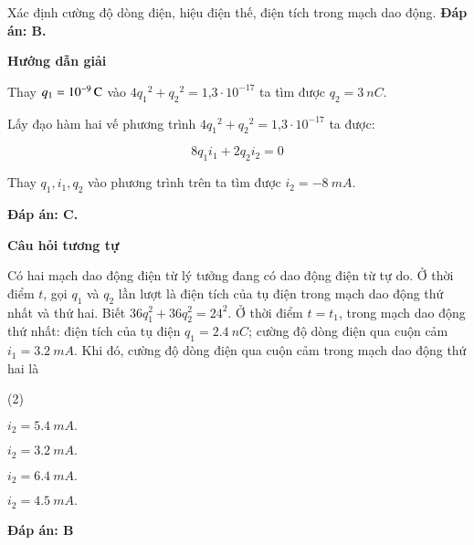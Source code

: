 \begin{dang}{Xác định cường độ dòng điện, hiệu điện thế, điện tích trong mạch dao động.}
{		\textbf{Đáp án: B.} 
	}
	{	\begin{center}
			\textbf{Hướng dẫn giải}
		\end{center}
		
		Thay $q_1 = \xsi{10^{-9}}{C}$ vào $4{q_1}^{2}+{q_2}^{2} = \text{1,3}\cdot10^{-17}$ ta tìm được $q_2 = \SI{3}{nC}$. 
		
		Lấy đạo hàm hai vế phương trình $4{q_1}^{2}+{q_2}^{2} = \text{1,3}\cdot10^{-17}$ ta được:
		
		$$8{q_1}{i_1} + 2{q_2}{i_2} = 0$$
		
		Thay $q_1, i_1, q_2$ vào phương trình trên ta tìm được $i_2 = \SI{-8}{mA}.$
		
		\textbf{Đáp án: C.}
		
		
		\begin{center}
			\textbf{Câu hỏi tương tự}
		\end{center}
		
		Có hai mạch dao động điện từ lý tưởng đang có dao động điện từ tự do. Ở thời điểm $t$, gọi $q_1$ và $q_2$ lần lượt là điện tích của tụ điện trong mạch dao động thứ nhất và thứ hai. Biết $36q_1^2 + 36q_2^2 = 24^2$. Ở thời điểm $t = t_1$, trong mạch dao động thứ nhất: điện tích của tụ điện $q_1 = \SI{2,4}{nC}$; cường độ dòng điện qua cuộn cảm $i_1 = \SI{3,2}{mA}$. Khi đó, cường độ dòng điện qua cuộn cảm trong mạch dao động thứ hai là
		\begin{mcq}(2)
			\item $i_2 = \SI{5,4}{mA}.$
			
			\item $i_2 = \SI{3,2}{mA}.$
			
			\item $i_2 = \SI{6,4}{mA}.$
			
			\item $i_2 = \SI{4,5}{mA}.$
		\end{mcq}
		\textbf{Đáp án: B} 
	}
\end{dang}
